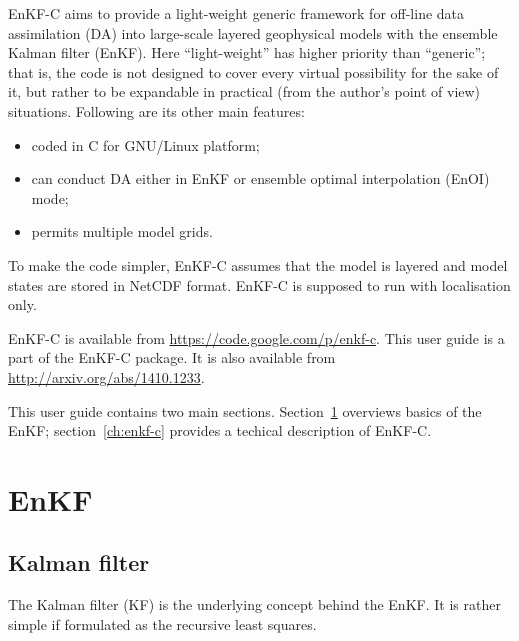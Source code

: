 \documentclass[11pt]{report}
\begin{document}
EnKF-C aims to provide a light-weight generic framework for off-line data assimilation (DA) into large-scale layered geophysical models with the ensemble Kalman filter (EnKF).
Here ``light-weight'' has higher priority than ``generic''; that is, the code is not designed to cover every virtual possibility for the sake of it, but rather to be expandable in practical (from the author's point of view) situations.
Following are its other main features:
\begin{itemize}
\item coded in C for GNU/Linux platform;
\item can conduct DA either in EnKF or ensemble optimal interpolation (EnOI) mode;
\item permits multiple model grids.
\end{itemize}

To make the code simpler, EnKF-C assumes that the model is layered and model states are stored in NetCDF format.
EnKF-C is supposed to run with localisation only.

EnKF-C is available from \url{https://code.google.com/p/enkf-c}.
This user guide is a part of the EnKF-C package. 
It is also available from \url{http://arxiv.org/abs/1410.1233}.

This user guide contains two main sections.
Section~\ref{ch:enkf} overviews basics of the EnKF; section~\ref{ch:enkf-c} provides a techical description of EnKF-C.

\chapter{EnKF}
\label{ch:enkf}

\section{Kalman filter}

The Kalman filter (KF) is the underlying concept behind the EnKF.
It is rather simple if formulated as the recursive least squares.
\end{document}
